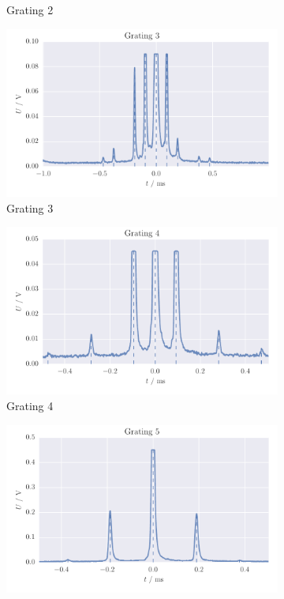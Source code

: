 \begin{figure}[H]
\begin{subfigure}[b]{\mpltw}
        \caption{Grating 2}
        \label{fig:gratings_maxi1}
    \end{subfigure}
    \begin{subfigure}[b]{\mpltw}
        \includegraphics[width=\textwidth]{figures/gratings_maxi3}
        \caption{Grating 3}
        \label{fig:gratings_maxi1}
    \end{subfigure}\quad
    \begin{subfigure}[b]{\mpltw}
        \includegraphics[width=\textwidth]{figures/gratings_maxi4}
        \caption{Grating 4}
        \label{fig:gratings_maxi1}
    \end{subfigure}
    \begin{subfigure}[b]{\mpltw}
        \includegraphics[width=\textwidth]{figures/gratings_maxi5}

\end{subfigure}
\end{figure}
